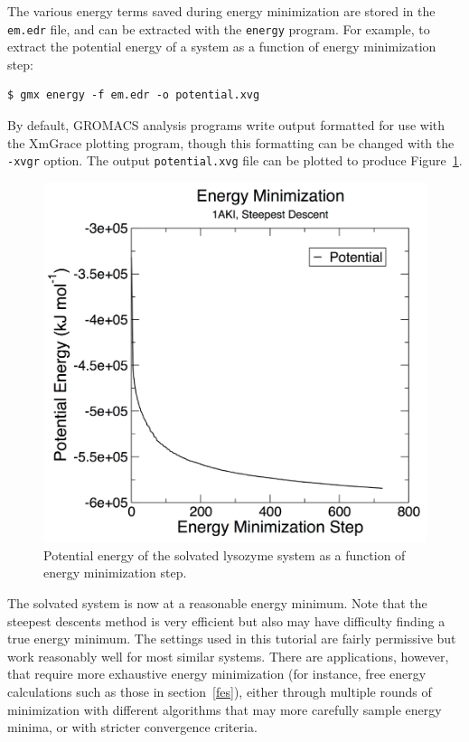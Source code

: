 \documentclass[9pt,tutorial,pubversion]{livecoms}
\begin{document}
The various energy terms saved during energy minimization are stored in the \texttt{em.edr} file, and can be extracted with the \texttt{energy} program. For example, to extract the potential energy of a system as a function of energy minimization step:

\begin{lstlisting}
$ gmx energy -f em.edr -o potential.xvg
\end{lstlisting}

By default, GROMACS analysis programs write output formatted for use with the XmGrace plotting program, though this formatting can be changed with the \texttt{-xvgr} option. The output \texttt{potential.xvg} file can be plotted to produce Figure~\ref{lyso_em_fig}.

\begin{figure}[h]
\centering
\includegraphics{plot_lyso_em_potential}
\caption{Potential energy of the solvated lysozyme system as a function of energy minimization step.}
\label{lyso_em_fig}
\end{figure}

The solvated system is now at a reasonable energy minimum. Note that the steepest descents method is very efficient but also may have difficulty finding a true energy minimum. The settings used in this tutorial are fairly permissive but work reasonably well for most similar systems. There are applications, however, that require more exhaustive energy minimization (for instance, free energy calculations such as those in section~\ref{fes}), either through multiple rounds of minimization with different algorithms that may more carefully sample energy minima, or with stricter convergence criteria.
\end{document}
